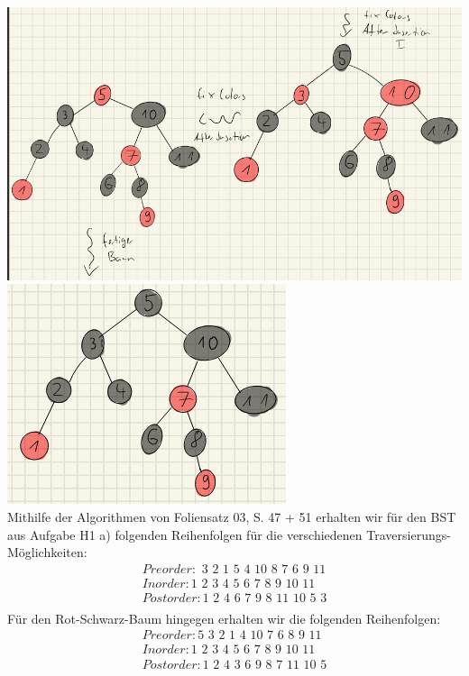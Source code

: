 \documentclass{article}
\begin{document}
\bigskip
\includegraphics[scale=0.5]{ h1_a11 } \\
\bigskip
\includegraphics[scale=1]{ h1_a12 } \\
\bigskip
Mithilfe der Algorithmen von Foliensatz 03, S. 47 + 51 erhalten wir für den BST aus Aufgabe H1 a) folgenden Reihenfolgen 
für die verschiedenen Traversierungs-Möglichkeiten:
\begin{align*}
    Preorder: \text{ 3 2 1 5 4 10 8 7 6 9 11} \\ 
    Inorder: \text{1 2 3 4 5 6 7 8 9 10 11} \\ 
    Postorder: \text{1 2 4 6 7 9 8 11 10 5 3} \\ 
\end{align*}
\newpage
Für den Rot-Schwarz-Baum hingegen erhalten wir die folgenden Reihenfolgen:
\begin{align*}
    Preorder: \text{5 3 2 1 4 10 7 6 8 9 11} \\
    Inorder: \text{1 2 3 4 5 6 7 8 9 10 11} \\ 
    Postorder: \text{1 2 4 3 6 9 8 7 11 10 5} \\ 
\end{align*}
\end{document}
